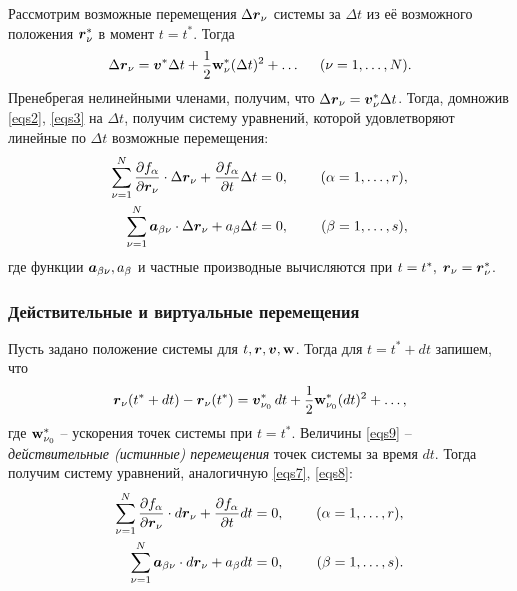 Рассмотрим возможные перемещения $\Delta \mbox{\boldmath $r$}_\nu$ системы за $\Delta t$ из её возможного положения $\mbox{\boldmath $r$}_\nu^*$ в момент $t=t^*$. Тогда 
\begin{equation}
    \Delta \mbox{\boldmath $r$}_\nu = \mbox{\boldmath $v$}^* \Delta t + \frac{1}{2} \mbox{\boldmath $\mathrm{w}$}_\nu^* (\Delta t)^2 + \ldots
    \hspace{0.5cm} (\nu = 1, \ldots, N).
\end{equation}
Пренебрегая нелинейными членами, получим, что $\Delta \mbox{\boldmath $r$}_\nu = \mbox{\boldmath $v$}_\nu^* \Delta t$. Тогда, домножив \eqref{eqs2}, \eqref{eqs3} на $\Delta t$, получим систему уравнений, которой удовлетворяют линейные по $\Delta t$ возможные перемещения:
\begin{align}
\label{eqs7}
    \sum_{\nu=1}^N \frac{\partial f_\alpha}{\partial \mbox{\boldmath $r$}_\nu} \cdot \Delta \mbox{\boldmath $r$}_\nu + \frac{\partial f_\alpha}{\partial t} \Delta t &= 0,
    \hspace{0.5cm} &(\alpha = 1, \ldots, r), \\
\label{eqs8}
    \sum_{\nu=1}^N \mbox{\boldmath $a$}_{\beta\nu} \cdot \Delta \mbox{\boldmath $r$}_\nu + a_\beta \Delta t &= 0,
    \hspace{0.5cm} &(\beta = 1, \ldots, s),
\end{align}
где функции $\mbox{\boldmath $a$}_{\beta\nu}, a_\beta$ и частные производные вычисляются при $t=t^*, \; \mbox{\boldmath $r$}_\nu = \mbox{\boldmath $r$}_\nu^*$.


\subsubsection*{Действительные и виртуальные перемещения}
Пусть задано положение системы для $t, \mbox{\boldmath $r$}, \mbox{\boldmath $v$}, \mbox{\boldmath $\mathrm{w}$}$. Тогда для $t = t^* + dt$ запишем, что
\begin{equation}
\label{eqs9}
    \mbox{\boldmath $r$}_\nu (t^* + dt) - \mbox{\boldmath $r$}_\nu (t^*) = \mbox{\boldmath $v$}_{\nu_0}^* \, d t + \frac{1}{2} \mbox{\boldmath $\mathrm{w}$}^*_{\nu_0} (dt)^2 + \ldots,
\end{equation}
где $\mbox{\boldmath $\mathrm{w}$}_{\nu_0}^*$ -- ускорения точек системы при $t = t^*$. Величины \eqref{eqs9} -- \textit{действительные (истинные) перемещения} точек системы за время $dt$. Тогда получим систему уравнений, аналогичную \eqref{eqs7}, \eqref{eqs8}:
\begin{align}
\label{eqs10}
    \sum_{\nu=1}^N \frac{\partial f_\alpha}{\partial \mbox{\boldmath $r$}_\nu} \cdot d \mbox{\boldmath $r$}_\nu + \frac{\partial f_\alpha}{\partial t} d t &= 0,
    \hspace{0.5cm} &(\alpha = 1, \ldots, r), \\
\label{eqs11}
    \sum_{\nu=1}^N \mbox{\boldmath $a$}_{\beta\nu} \cdot d \mbox{\boldmath $r$}_\nu + a_\beta d t &= 0,
    \hspace{0.5cm} &(\beta = 1, \ldots, s).
\end{align}


